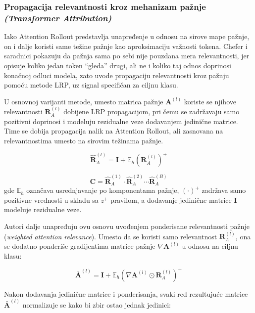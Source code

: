 \subsubsection{Propagacija relevantnosti kroz mehanizam pažnje \textit{(Transformer Attribution)}}

Iako Attention Rollout predstavlja unapređenje u odnosu na sirove mape pažnje, on i dalje koristi same težine pažnje kao aproksimaciju važnosti tokena. Chefer i saradnici \cite{chefer2021transformer} pokazuju da pažnja sama po sebi nije pouzdana mera relevantnosti, jer opisuje koliko jedan token “gleda” drugi, ali ne i koliko taj odnos doprinosi konačnoj odluci modela, zato uvode propagaciju relevantnosti kroz pažnju pomoću metode LRP, uz signal specifičan za ciljnu klasu.

U osnovnoj varijanti metode, umesto matrica pažnje $\mathbf{A}^{(l)}$ koriste 
se njihove relevantnosti $\mathbf{R}_A^{(l)}$ dobijene LRP propagacijom, pri 
čemu se zadržavaju samo pozitivni doprinosi i 
modeluju rezidualne veze dodavanjem jedinične matrice. Time se dobija propagacija 
nalik na Attention Rollout, ali zasnovana na relevantnostima umesto na sirovim težinama pažnje.

\begin{equation}
    \hat{\mathbf{R}}_A^{(l)} = \mathbf{I} + \mathbb{E}_h\left(\mathbf{R}_A^{(l)}\right)^+
\end{equation}

\begin{equation}
    \mathbf{C} = \hat{\mathbf{R}}_A^{(1)} \cdot \hat{\mathbf{R}}_A^{(2)} 
    \cdots \hat{\mathbf{R}}_A^{(B)}
\end{equation}
gde $\mathbb{E}_h$ označava usrednjavanje po komponentama pažnje, $(\cdot)^+$ 
zadržava samo pozitivne vrednosti u skladu sa $z^+$-pravilom, a dodavanje 
jedinične matrice $\mathbf{I}$ modeluje rezidualne veze.

Autori dalje unapređuju ovu osnovu uvođenjem ponderisane relevantnosti pažnje 
(\textit{weighted attention relevance}). Umesto da se koristi samo relevantnost 
$\mathbf{R}_A^{(l)}$, ona se dodatno ponderiše gradijentima matrice pažnje 
$\nabla \mathbf{A}^{(l)}$ u odnosu na ciljnu klasu:

\begin{equation}
    \bar{\mathbf{A}}^{(l)} = \mathbf{I} + 
    \mathbb{E}_h\left(\nabla \mathbf{A}^{(l)} \odot \mathbf{R}_A^{(l)}\right)^+
\end{equation}

Nakon dodavanja jedinične matrice i ponderisanja, svaki red rezultujuće 
matrice $\bar{\mathbf{A}}^{(l)}$ normalizuje se kako bi zbir ostao jednak 
jedinici:

